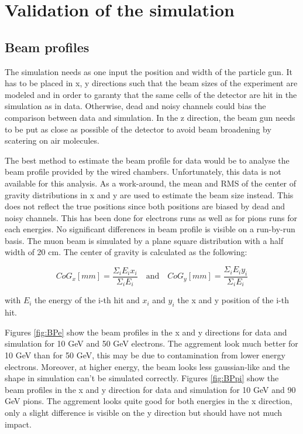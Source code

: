 \chapter{Validation of the simulation}
\label{appendix:SimulationVal}

\section{Beam profiles}

The simulation needs as one input the position and width of the particle gun. It has to be placed in x, y directions such that the beam sizes of the experiment are modeled and in order to garanty that the same cells of the detector are hit in the simulation as in data. Otherwise, dead and noisy channels could bias the comparison between data and simulation. In the z direction, the beam gun needs to be put as close as possible of the detector to avoid beam broadening by scatering on air molecules.

The best method to estimate the beam profile for data would be to analyse the beam profile provided by the wired chambers. Unfortunately, this data is not available for this analysis. As a work-around, the mean and RMS of the center of gravity distributions in x and y are used to estimate the beam size instead. This does not reflect the true positions since both positions are biased by dead and noisy channels. This has been done for electrons runs as well as for pions runs for each energies. No significant differences in beam profile is visible on a run-by-run basis. The muon beam is simulated by a plane square distribution with a half width of 20 cm. The center of gravity is calculated as the following:

\begin{equation}
  CoG_x [mm] = \frac{\Sigma_i E_i x_i}{\Sigma_i E_i} \quad \text{and} \quad CoG_y [mm] = \frac{\Sigma_i E_i y_i}{\Sigma_i E_i}
\end{equation}

\noindent with $E_i$ the energy of the i-th hit and $x_i$ and $y_i$ the x and y position of the i-th hit.

Figures \ref{fig:BPe} show the beam profiles in the x and y directions for data and simulation for 10 GeV and 50 GeV electrons. The aggrement look much better for 10 GeV than for 50 GeV, this may be due to contamination from lower energy electrons. Moreover, at higher energy, the beam looks less gaussian-like and the shape in simulation can't be simulated correctly. Figures \ref{fig:BPpi} show the beam profiles in the x and y direction for data and simulation for 10 GeV and 90 GeV pions. The aggrement looks quite good for both energies in the x direction, only a slight difference is visible on the y direction but should have not much impact.

